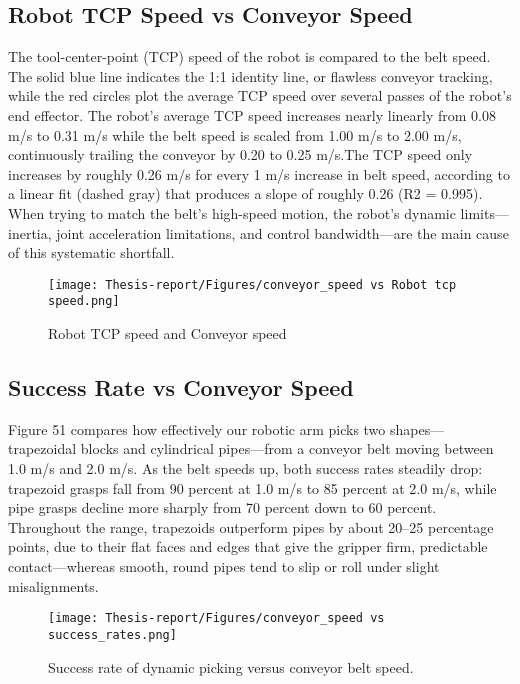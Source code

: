 \documentclass[12pt]{article}
\begin{document}
\subsection{Robot TCP Speed vs Conveyor Speed}
The tool-center-point (TCP) speed of the robot is compared to the belt speed.
 The solid blue line indicates the 1:1 identity line, or flawless conveyor tracking, while the red circles plot the average TCP speed over several passes of the robot's end effector.  The robot's average TCP speed increases nearly linearly from 0.08 m/s to 0.31 m/s while the belt speed is scaled from 1.00 m/s to 2.00 m/s, continuously trailing the conveyor by 0.20 to 0.25 m/s.The TCP speed only increases by roughly 0.26 m/s for every 1 m/s increase in belt speed, according to a linear fit (dashed gray) that produces a slope of roughly 0.26 (R2 = 0.995).  When trying to match the belt's high-speed motion, the robot's dynamic limits—inertia, joint acceleration limitations, and control bandwidth—are the main cause of this systematic shortfall.
 
\begin{figure}[h]
    \centering
    \texttt{[image: Thesis-report/Figures/conveyor\_speed vs Robot tcp speed.png]}
    \caption{Robot TCP speed and Conveyor speed \cite{ref22}}
    \label{fig1.Photoneo Cmaera}
\end{figure}


\subsection{Success Rate vs Conveyor Speed}
Figure 51 compares how effectively our robotic arm picks two shapes—trapezoidal blocks and cylindrical pipes—from a conveyor belt moving between 1.0 m/s and 2.0 m/s. As the belt speeds up, both success rates steadily drop: trapezoid grasps fall from 90 percent at 1.0 m/s to 85 percent at 2.0 m/s, while pipe grasps decline more sharply from 70 percent down to 60 percent. Throughout the range, trapezoids outperform pipes by about 20–25 percentage points, due to their flat faces and edges that give the gripper firm, predictable contact—whereas smooth, round pipes tend to slip or roll under slight misalignments.
\begin{figure}[h]
    \centering
    \texttt{[image: Thesis-report/Figures/conveyor\_speed vs success\_rates.png]}
    \caption{Success rate of dynamic picking versus conveyor belt speed. \cite{ref22}}
    \label{fig1.Photoneo Cmaera}
\end{figure}
\end{document}
